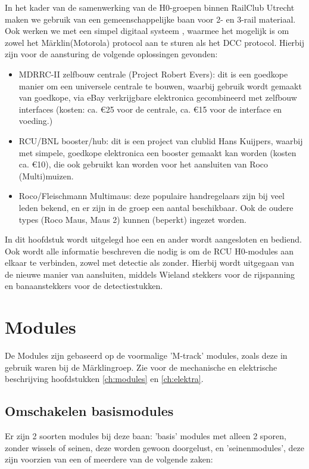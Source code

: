 \documentclass[12pt,a4paper]{report}
\newcommand*{\marklin}{M\"{a}rklin}
\begin{document}
In het kader van de samenwerking van de H0-groepen binnen RailClub Utrecht maken we gebruik van een gemeenschappelijke baan voor 2- en 3-rail materiaal. Ook werken we met een simpel digitaal systeem , waarmee het mogelijk is om zowel het \marklin (Motorola) protocol aan te sturen als het DCC protocol.
Hierbij zijn voor de aansturing de volgende oplossingen gevonden:
\begin{itemize}
\item MDRRC-II zelfbouw centrale (Project Robert Evers): dit is een goedkope manier om een universele centrale te bouwen, waarbij gebruik wordt gemaakt van goedkope, via eBay verkrijgbare elektronica gecombineerd met zelfbouw interfaces (kosten: ca. \euro 25 voor de centrale, ca. \euro 15 voor de interface en voeding.)
\item RCU/BNL booster/hub: dit is een project van clublid Hans Kuijpers, waarbij met simpele, goedkope elektronica een booster gemaakt kan worden (kosten ca. \euro 10), die ook gebruikt kan worden voor het aansluiten van Roco (Multi)muizen.
\item Roco/Fleischmann Multimaus: deze populaire handregelaars zijn bij veel leden bekend, en er zijn in de groep een aantal beschikbaar. Ook de oudere types (Roco Maus, Maus 2) kunnen (beperkt) ingezet worden.
\end{itemize}

In dit hoofdstuk wordt uitgelegd hoe een en ander wordt aangesloten en bediend. Ook wordt alle informatie beschreven die nodig is om de RCU H0-modules aan elkaar te verbinden, zowel met detectie als zonder. Hierbij wordt uitgegaan van de nieuwe manier van aansluiten, middels Wieland stekkers voor de rijspanning en banaanstekkers voor de detectiestukken.

\section{Modules}
De Modules zijn gebaseerd op de voormalige 'M-track' modules, zoals deze in gebruik waren bij de \marklin groep. Zie voor de mechanische  en elektrische beschrijving hoofdstukken \ref{ch:modules} en \ref{ch:elektra}.

\subsection{Omschakelen basismodules}
Er zijn 2 soorten modules bij deze baan: 'basis' modules met alleen 2 sporen, zonder wissels of seinen, deze worden gewoon doorgelust, en 'seinenmodules', deze zijn voorzien van een of meerdere van de volgende zaken:
\end{document}
